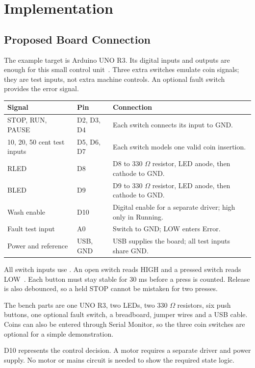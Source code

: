 \section{Implementation}
\subsection{Proposed Board Connection}
The example target is Arduino UNO R3. Its digital inputs and outputs are enough
for this small control unit~\cite{uno}. Three extra switches emulate coin signals;
they are test inputs, not extra machine controls. An optional fault switch
provides the error signal.

\begin{tabularx}{\linewidth}{@{}p{3.5cm}p{2.05cm}Y@{}}
\toprule
Signal & Pin & Connection\\
\midrule
STOP, RUN, PAUSE & D2, D3, D4 & Each switch connects its input to GND.\\
10, 20, 50 cent test inputs & D5, D6, D7 & Each switch models one valid coin insertion.\\
RLED & D8 & D8 to 330 $\Omega$ resistor, LED anode, then cathode to GND.\\
BLED & D9 & D9 to 330 $\Omega$ resistor, LED anode, then cathode to GND.\\
Wash enable & D10 & Digital enable for a separate driver; high only in Running.\\
Fault test input & A0 & Switch to GND; LOW enters Error.\\
Power and reference & USB, GND & USB supplies the board; all test inputs share GND.\\
\bottomrule
\end{tabularx}


All switch inputs use . An open switch reads HIGH and a
pressed switch reads LOW~\cite{pullup}. Each button must stay stable for 30 ms
before a press is counted. Release is also debounced, so a held STOP cannot be
mistaken for two presses.

The bench parts are one UNO R3, two LEDs, two 330 $\Omega$ resistors, six push
buttons, one optional fault switch, a breadboard, jumper wires and a USB cable.
Coins can also be entered through Serial Monitor, so the three coin switches
are optional for a simple demonstration.

D10 represents the control decision. A motor requires a separate driver and
power supply. No motor or mains circuit is needed to show the required state logic.

